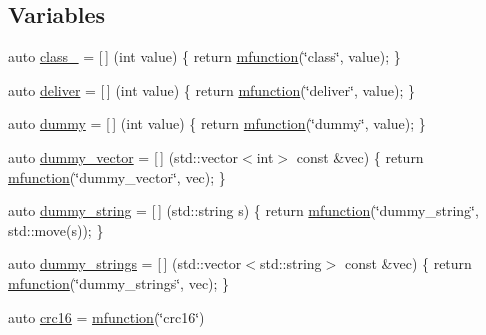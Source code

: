 \subsection*{Variables}
\begin{DoxyCompactItemize}
\item 
auto \hyperlink{namespacepfq_1_1lang_1_1experimental_1_1anonymous__namespace_02experimental_8hpp_03_a55ce0b220b42a47460d1d40d3d5fdd5d}{class\+\_\+} = \mbox{[}$\,$\mbox{]} (int value) \{ return \hyperlink{namespacepfq_1_1lang_a1aacba4a159b6c2ddf275bd1fec19ec2}{mfunction}(\char`\"{}class\char`\"{}, value); \}
\item 
auto \hyperlink{namespacepfq_1_1lang_1_1experimental_1_1anonymous__namespace_02experimental_8hpp_03_aabd600ebf1ee62184fa0765f49f9f990}{deliver} = \mbox{[}$\,$\mbox{]} (int value) \{ return \hyperlink{namespacepfq_1_1lang_a1aacba4a159b6c2ddf275bd1fec19ec2}{mfunction}(\char`\"{}deliver\char`\"{}, value); \}
\item 
auto \hyperlink{namespacepfq_1_1lang_1_1experimental_1_1anonymous__namespace_02experimental_8hpp_03_a5fc8274e9598b8524f833264174b62b7}{dummy} = \mbox{[}$\,$\mbox{]} (int value) \{ return \hyperlink{namespacepfq_1_1lang_a1aacba4a159b6c2ddf275bd1fec19ec2}{mfunction}(\char`\"{}dummy\char`\"{}, value); \}
\item 
auto \hyperlink{namespacepfq_1_1lang_1_1experimental_1_1anonymous__namespace_02experimental_8hpp_03_a8ee61246090fb5d74e96dbb7f19b7008}{dummy\+\_\+vector} = \mbox{[}$\,$\mbox{]} (std\+::vector$<$int$>$ const \&vec) \{ return \hyperlink{namespacepfq_1_1lang_a1aacba4a159b6c2ddf275bd1fec19ec2}{mfunction}(\char`\"{}dummy\+\_\+vector\char`\"{}, vec); \}
\item 
auto \hyperlink{namespacepfq_1_1lang_1_1experimental_1_1anonymous__namespace_02experimental_8hpp_03_a354cb0bfb9d9033e9d87f03fba7c7267}{dummy\+\_\+string} = \mbox{[}$\,$\mbox{]} (std\+::string s) \{ return \hyperlink{namespacepfq_1_1lang_a1aacba4a159b6c2ddf275bd1fec19ec2}{mfunction}(\char`\"{}dummy\+\_\+string\char`\"{}, std\+::move(s)); \}
\item 
auto \hyperlink{namespacepfq_1_1lang_1_1experimental_1_1anonymous__namespace_02experimental_8hpp_03_af6c041f2494f9dd06acb73d42524e3ad}{dummy\+\_\+strings} = \mbox{[}$\,$\mbox{]} (std\+::vector$<$std\+::string$>$ const \&vec) \{ return \hyperlink{namespacepfq_1_1lang_a1aacba4a159b6c2ddf275bd1fec19ec2}{mfunction}(\char`\"{}dummy\+\_\+strings\char`\"{}, vec); \}
\item 
auto \hyperlink{namespacepfq_1_1lang_1_1experimental_1_1anonymous__namespace_02experimental_8hpp_03_a8152d34c5c69cc26aaa2b4a14ed37af1}{crc16} = \hyperlink{namespacepfq_1_1lang_a1aacba4a159b6c2ddf275bd1fec19ec2}{mfunction}(\char`\"{}crc16\char`\"{})
\end{DoxyCompactItemize}


